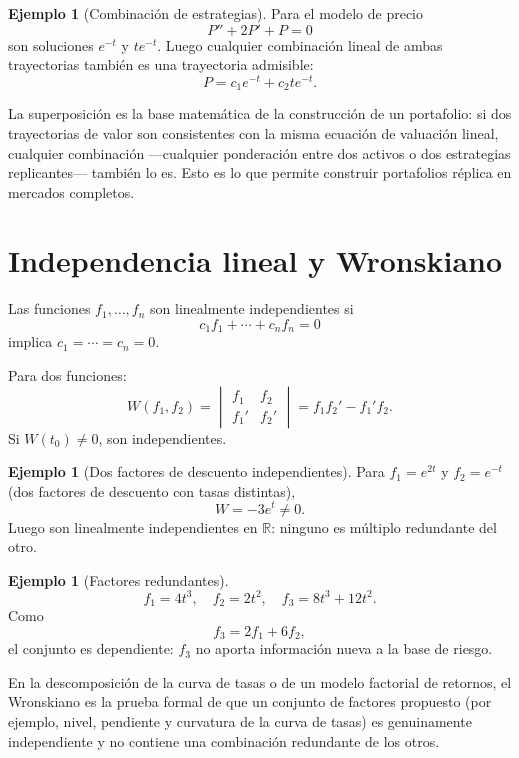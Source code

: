 \documentclass[11pt]{article}
\theoremstyle{definition}
\newtheorem{ejemplo}[teorema]{Ejemplo}
\newcommand{\R}{\mathbb R}
\begin{document}
\begin{ejemplo}[Combinación de estrategias]
Para el modelo de precio
\[
P''+2P'+P=0
\]
son soluciones $e^{-t}$ y $te^{-t}$. Luego cualquier combinación lineal de ambas
trayectorias también es una trayectoria admisible:
\[
\boxed{P=c_1e^{-t}+c_2te^{-t}}.
\]
\end{ejemplo}

\begin{finanzas}
La superposición es la base matemática de la construcción de un portafolio: si dos
trayectorias de valor son consistentes con la misma ecuación de valuación lineal,
cualquier combinación —cualquier ponderación entre dos activos o dos estrategias
replicantes— también lo es. Esto es lo que permite construir portafolios réplica en
mercados completos.
\end{finanzas}

\section{Independencia lineal y Wronskiano}
Las funciones $f_1,\ldots,f_n$ son linealmente independientes si
\[
c_1f_1+\cdots+c_nf_n=0
\]
implica $c_1=\cdots=c_n=0$.

Para dos funciones:
\[
W(f_1,f_2)=
\begin{vmatrix}f_1&f_2\\f_1'&f_2'\end{vmatrix}
=f_1f_2'-f_1'f_2.
\]
Si $W(t_0)\ne0$, son independientes.

\begin{ejemplo}[Dos factores de descuento independientes]
Para $f_1=e^{2t}$ y $f_2=e^{-t}$ (dos factores de descuento con tasas distintas),
\[
W=-3e^t\ne0.
\]
Luego son linealmente independientes en $\R$: ninguno es múltiplo redundante del otro.
\end{ejemplo}

\begin{ejemplo}[Factores redundantes]
\[
f_1=4t^3,\quad f_2=2t^2,\quad f_3=8t^3+12t^2.
\]
Como
\[
f_3=2f_1+6f_2,
\]
el conjunto es dependiente: $f_3$ no aporta información nueva a la base de riesgo.
\end{ejemplo}

\begin{finanzas}
En la descomposición de la curva de tasas o de un modelo factorial de retornos, el
Wronskiano es la prueba formal de que un conjunto de factores propuesto (por ejemplo,
nivel, pendiente y curvatura de la curva de tasas) es genuinamente independiente y no
contiene una combinación redundante de los otros.
\end{finanzas}
\end{document}
